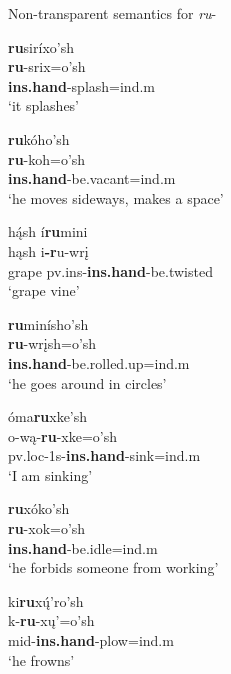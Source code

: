 \begin{exe}
\item\label{ruexceptions} Non-transparent semantics for \textit{ru}-

	\begin{xlist}

	\item \glll \textbf{ru}siríxo'sh\\
	\textbf{ru}-srix=o'sh\\
	\textbf{ins.hand}-\textnormal{splash}=ind.m\\
	\glt `it splashes' \citep[218]{hollow1970}
	
	\item \glll \textbf{ru}kóho'sh\\
	\textbf{ru}-koh=o'sh\\
	\textbf{ins.hand}-\textnormal{be.vacant}=ind.m\\
	\glt `he moves sideways, makes a space' \citep[114]{hollow1970}
	
	\item \glll hą́sh í\textbf{ru}mini\\
	hąsh i\textbf{-r}u-wrį\\
	\textnormal{grape} pv.ins-\textbf{ins.hand}-\textnormal{be.twisted}\\
	\glt `grape vine' \citep[196]{trechter2012b}

	\item \glll \textbf{ru}minísho'sh\\
	\textbf{ru}-wrįsh=o'sh\\
	\textbf{ins.hand}-\textnormal{be.rolled.up}=ind.m\\
	\glt `he goes around in circles' \citep[305]{hollow1970}

	\item \glll óma\textbf{ru}xke'sh\\
	o-wą-\textbf{ru}-xke=o'sh\\
	pv.loc-1s-\textbf{ins.hand}-\textnormal{sink}=ind.m\\
	\glt `I am sinking' \citep[317]{hollow1970}

	\item \glll \textbf{ru}xóko'sh\\
	\textbf{ru}-xok=o'sh\\
	\textbf{ins.hand}-\textnormal{be.idle}=ind.m\\
	\glt `he forbids someone from working' \citep[319]{hollow1970}
	
	\item \glll ki\textbf{ru}xų́'ro'sh\\
	k-\textbf{ru}-xų'=o'sh\\
	mid-\textbf{ins.hand}-\textnormal{plow}=ind.m\\
	\glt `he frowns' \citep[331]{hollow1970}
	
	\end{xlist}

\end{exe}

